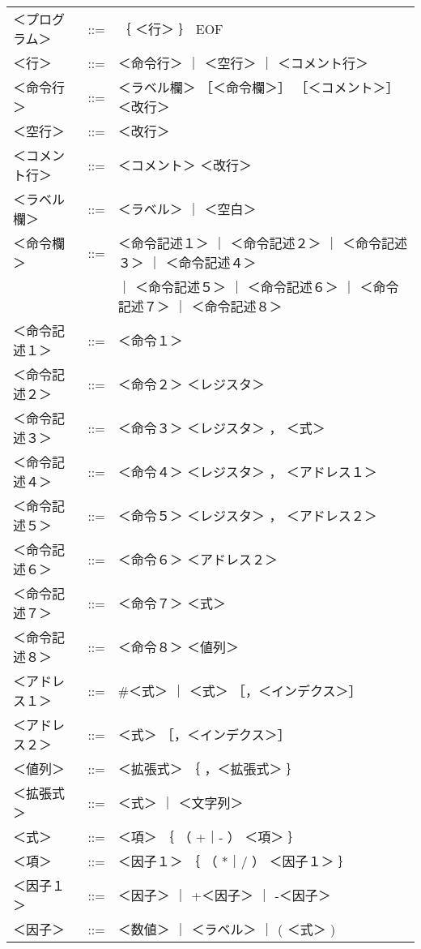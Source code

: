 \onecolumn

\begin{center}
{\small\tt\begin{tabular}{lll}
＜プログラム＞& ::= &｛ ＜行＞ ｝ EOF \\
＜行＞        & ::= &＜命令行＞ ｜ ＜空行＞ ｜ ＜コメント行＞ \\
＜命令行＞    & ::= &＜ラベル欄＞ ［＜命令欄＞］ ［＜コメント＞］ ＜改行＞ \\
＜空行＞      & ::= &＜改行＞ \\
＜コメント行＞& ::= &＜コメント＞ ＜改行＞ \\
＜ラベル欄＞  & ::= &＜ラベル＞ ｜ ＜空白＞ \\
＜命令欄＞    & ::= &＜命令記述１＞ ｜ ＜命令記述２＞ ｜ ＜命令記述３＞
                       ｜ ＜命令記述４＞ \\
              &     &  ｜ ＜命令記述５＞ ｜ ＜命令記述６＞ 
                       ｜ ＜命令記述７＞ ｜ ＜命令記述８＞ \\
＜命令記述１＞& ::= &＜命令１＞ \\
＜命令記述２＞& ::= &＜命令２＞ ＜レジスタ＞ \\
＜命令記述３＞& ::= &＜命令３＞ ＜レジスタ＞ ， ＜式＞ \\
＜命令記述４＞& ::= &＜命令４＞ ＜レジスタ＞ ， ＜アドレス１＞ \\
＜命令記述５＞& ::= &＜命令５＞ ＜レジスタ＞ ， ＜アドレス２＞ \\
＜命令記述６＞& ::= &＜命令６＞ ＜アドレス２＞ \\
＜命令記述７＞& ::= &＜命令７＞ ＜式＞ \\
＜命令記述８＞& ::= &＜命令８＞ ＜値列＞ \\
＜アドレス１＞& ::= &\#＜式＞ ｜ ＜式＞ ［，＜インデクス＞］ \\
＜アドレス２＞& ::= &＜式＞ ［，＜インデクス＞］ \\
＜値列＞      & ::= &＜拡張式＞ ｛ ，＜拡張式＞ ｝ \\
＜拡張式＞    & ::= &＜式＞ ｜ ＜文字列＞ \\
＜式＞        & ::= &＜項＞ ｛ （ +｜- ） ＜項＞ ｝ \\
＜項＞        & ::= &＜因子１＞ ｛ （ *｜/ ） ＜因子１＞ ｝ \\
＜因子１＞    & ::= &＜因子＞ ｜ +＜因子＞ ｜ -＜因子＞ \\
＜因子＞      & ::= &＜数値＞ ｜ ＜ラベル＞ ｜ ( ＜式＞ ) \\

\end{tabular}}
\end{center}
